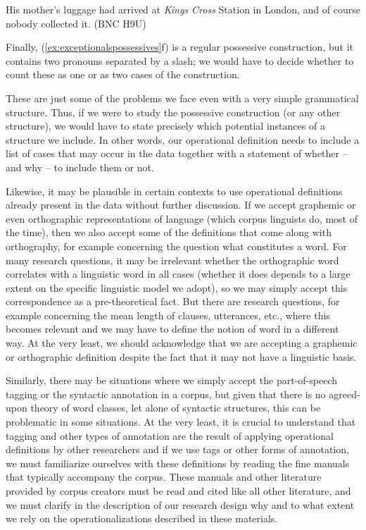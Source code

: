 \begin{exe}
\ex His mother's luggage had arrived at \textit{Kings Cross} Station in London, and of course nobody collected it. (BNC H9U)
\label{ex:kingscrossnoapostrophe}
\end{exe}

Finally, (\ref{ex:exceptionalspossessives}f) is a regular possessive construction, but it contains two pronouns separated by a slash; we would have to decide whether to count these as one or as two cases of the construction.

These are just some of the problems we face even with a very simple grammatical structure. Thus, if we were to study the possessive construction (or any other structure), we would have to state precisely which potential instances of a structure we include. In other words, our operational definition needs to include a list of cases that may occur in the data together with a statement of whether -- and why -- to include them or not.

Likewise, it may be plausible in certain contexts to use operational definitions already present in the data without further discussion. If we accept graphemic or even orthographic representations of language (which corpus linguists do, most of the time), then we also accept some of the definitions that come along with orthography, for example concerning the question what constitutes a word. For many research questions, it may be irrelevant whether the orthographic word correlates with a linguistic word in all cases (whether it does depends to a large extent on the specific linguistic model we adopt), so we may simply accept this correspondence as a pre-theoretical fact. But there are research questions, for example concerning the mean length of clauses, utterances, etc., where this becomes relevant and we may have to define the notion of word in a different way. At the very least, we should acknowledge that we are accepting a graphemic or orthographic definition despite the fact that it may not have a linguistic basis. 

Similarly, there may be situations where we simply accept the part-of-speech tagging or the syntactic annotation in a corpus, but given that there is no agreed-upon theory of word classes, let alone of syntactic structures, this can be problematic in some situations. At the very least, it is crucial to understand that tagging and other types of annotation are  the result of applying operational definitions by other researchers and if we use tags or other forms of annotation, we must familiarize ourselves with these definitions by reading the fine manuals that typically accompany the corpus. These manuals and other literature provided by corpus creators must be read and cited like all other literature, and we must clarify in the description of our research design why and to what extent we rely on the operationalizations described in these materials.

